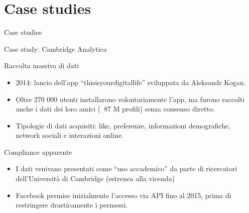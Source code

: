 \documentclass[12pt]{beamer}
\begin{document}
\section{Case studies}

\begin{frame}
\Huge
\begin{center}
Case studies
\end{center}
\end{frame}

\begin{frame}{Case study: Cambridge Analytica }
  \begin{alertblock}{Raccolta massiva di dati}
    \begin{itemize}
      \item 2014: lancio dell’app “thisisyourdigitallife” sviluppata da Aleksandr Kogan.
      \item Oltre 270 000 utenti installarono volontariamente l’app, ma furono raccolti anche i dati dei loro amici (~87 M profili) senza consenso diretto.
      \item Tipologie di dati acquisiti: like, preferenze, informazioni demografiche, network sociali e interazioni online.
    \end{itemize}
  \end{alertblock}
  \begin{alertblock}{Compliance apparente}
    \begin{itemize}
      \item I dati venivano presentati come “uso accademico” da parte di ricercatori dell’Università di Cambridge (estrenea alla vicenda)
      \item Facebook permise inizialmente l’accesso via API fino al 2015, prima di restringere drasticamente i permessi.
    \end{itemize}
  \end{alertblock}
\end{frame}
\end{document}
